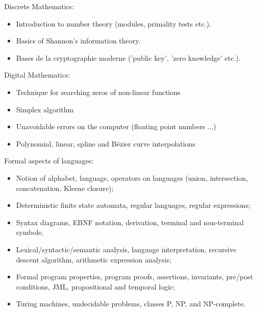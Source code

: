 Discrete Mathematics:
\begin{itemize}
    \item Introduction to number theory (modules, primality tests etc.).
    \item Basics of Shannon's information theory.
    \item Bases de la cryptographie moderne ('public key', 'zero knowledge' etc.).
\end{itemize}
Digital Mathematics:
\begin{itemize}
    \item Technique for searching zeros of non-linear functions
    \item Simplex algorithm
    \item Unavoidable errors on the computer (floating point numbers ...)
    \item Polynomial, linear, spline and Bézier curve interpolations
\end{itemize}
\pagebreak
Formal aspects of languages:
\begin{itemize}
    \item Notion of alphabet, language, operators on languages (union, intersection, concatenation, Kleene closure);
    \item Deterministic finite state automata, regular languages, regular expressions;
    \item Syntax diagrams, EBNF notation, derivation, terminal and non-terminal symbols;
    \item Lexical/syntactic/semantic analysis, language interpretation, recursive descent algorithm, arithmetic expression analysis;
    \item Formal program properties, program proofs, assertions, invariants, pre/post conditions, JML, propositional and temporal logic;
    \item Turing machines, undecidable problems, classes P, NP, and NP-complete.
\end{itemize}